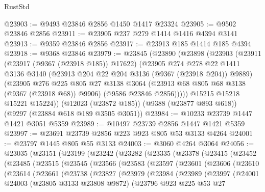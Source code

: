 \begin{lexlean}{RustStd}
\begin{coremodule}
@23903 := @9493 @23846 @2856 @1450 @1417 @23324
@23905 := @9502 @23846 @2856
@23911 := @23905 @237 @279 @1414 @1416 @4394 @3141
@23913 := @9359 @23846 @2856
@23917 := @23913 @185 @1414 @185 @4394
@23918 := @9368 @23846
@23979 := @23845
    (@23890
      (@23898
        (@23903
          (@23911
            (@23917 (@9367 (@23918 @185)) @17622)
            (@23905
              @274
              @278
              @22
              @1411
              @3136
              @3140
              (@23913 @204 @22 @204 @3136 (@9367 (@23918 @204)) @9889)
              (@23905
                @276
                @225
                @805
                @27
                @3138
                @3064
                (@23913 @68 @805 @68 @3138 (@9367 (@23918 @68)) @9906)
                (@9586 @23846 @2856)))))
        @15215
        @15218
        @15221
        @15224))
    (@12023 (@23872 @185))
    (@9388 (@23877 @893 @618))
    (@9297 (@23884 @618 @189 @3505 @3051))
@23984 := @10233 @23739 @1447 @1421 @3051 @5359
@23989 := @10497 @23739 @2856 @1447 @1421 @5359
@23997 := @23691 @23739 @2856 @223 @923 @805 @53 @3133 @4264
@24001 := @23797 @1445 @805 @55 @3133
@24003 := @3060 @4264 @3064
@24056 := @23035
    (@23151
      (@23199
        (@23242
          (@23282
            (@23335
              (@23378
                (@23415
                  (@23452
                    (@23485
                      (@23515
                        (@23545
                          (@23566
                            (@23583
                              (@23597
                                (@23601
                                  (@23606
                                    (@23610
                                      (@23614
                                        (@23661
                                          (@23738
                                            (@23827
                                              (@23979
                                                (@23984
                                                  (@23989
                                                    (@23997
                                                      (@24001
                                                        @24003
                                                        (@23805 @3133 @23808 @9872)
                                                        (@23796
                                                          @923
                                                          @225
                                                          @53
                                                          @27

\end{coremodule}
\end{lexlean}
